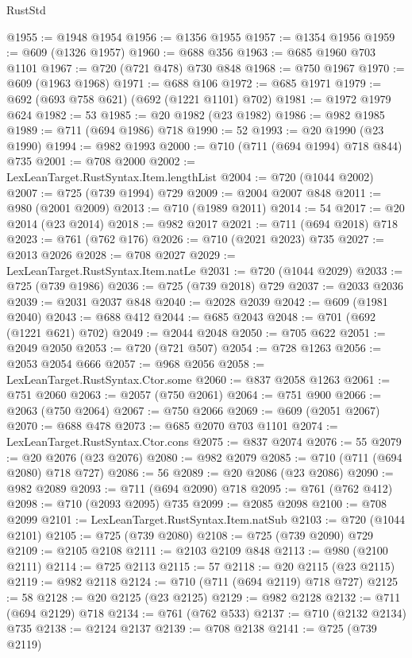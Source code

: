 \begin{lexlean}{RustStd}
\begin{coremodule}
@1955 := @1948 @1954
@1956 := @1356 @1955
@1957 := @1354 @1956
@1959 := @609 (@1326 @1957)
@1960 := @688 @356
@1963 := @685 @1960 @703 @1101
@1967 := @720 (@721 @478) @730 @848
@1968 := @750 @1967
@1970 := @609 (@1963 @1968)
@1971 := @688 @106
@1972 := @685 @1971
@1979 := @692 (@693 @758 @621) (@692 (@1221 @1101) @702)
@1981 := @1972 @1979 @624
@1982 := 53
@1985 := @20 @1982 (@23 @1982)
@1986 := @982 @1985
@1989 := @711 (@694 @1986) @718
@1990 := 52
@1993 := @20 @1990 (@23 @1990)
@1994 := @982 @1993
@2000 := @710 (@711 (@694 @1994) @718 @844) @735
@2001 := @708 @2000
@2002 := LexLeanTarget.RustSyntax.Item.lengthList
@2004 := @720 (@1044 @2002)
@2007 := @725 (@739 @1994) @729
@2009 := @2004 @2007 @848
@2011 := @980 (@2001 @2009)
@2013 := @710 (@1989 @2011)
@2014 := 54
@2017 := @20 @2014 (@23 @2014)
@2018 := @982 @2017
@2021 := @711 (@694 @2018) @718
@2023 := @761 (@762 @176)
@2026 := @710 (@2021 @2023) @735
@2027 := @2013 @2026
@2028 := @708 @2027
@2029 := LexLeanTarget.RustSyntax.Item.natLe
@2031 := @720 (@1044 @2029)
@2033 := @725 (@739 @1986)
@2036 := @725 (@739 @2018) @729
@2037 := @2033 @2036
@2039 := @2031 @2037 @848
@2040 := @2028 @2039
@2042 := @609 (@1981 @2040)
@2043 := @688 @412
@2044 := @685 @2043
@2048 := @701 (@692 (@1221 @621) @702)
@2049 := @2044 @2048
@2050 := @705 @622
@2051 := @2049 @2050
@2053 := @720 (@721 @507)
@2054 := @728 @1263
@2056 := @2053 @2054 @666
@2057 := @968 @2056
@2058 := LexLeanTarget.RustSyntax.Ctor.some
@2060 := @837 @2058 @1263
@2061 := @751 @2060
@2063 := @2057 (@750 @2061)
@2064 := @751 @900
@2066 := @2063 (@750 @2064)
@2067 := @750 @2066
@2069 := @609 (@2051 @2067)
@2070 := @688 @478
@2073 := @685 @2070 @703 @1101
@2074 := LexLeanTarget.RustSyntax.Ctor.cons
@2075 := @837 @2074
@2076 := 55
@2079 := @20 @2076 (@23 @2076)
@2080 := @982 @2079
@2085 := @710 (@711 (@694 @2080) @718 @727)
@2086 := 56
@2089 := @20 @2086 (@23 @2086)
@2090 := @982 @2089
@2093 := @711 (@694 @2090) @718
@2095 := @761 (@762 @412)
@2098 := @710 (@2093 @2095) @735
@2099 := @2085 @2098
@2100 := @708 @2099
@2101 := LexLeanTarget.RustSyntax.Item.natSub
@2103 := @720 (@1044 @2101)
@2105 := @725 (@739 @2080)
@2108 := @725 (@739 @2090) @729
@2109 := @2105 @2108
@2111 := @2103 @2109 @848
@2113 := @980 (@2100 @2111)
@2114 := @725 @2113
@2115 := 57
@2118 := @20 @2115 (@23 @2115)
@2119 := @982 @2118
@2124 := @710 (@711 (@694 @2119) @718 @727)
@2125 := 58
@2128 := @20 @2125 (@23 @2125)
@2129 := @982 @2128
@2132 := @711 (@694 @2129) @718
@2134 := @761 (@762 @533)
@2137 := @710 (@2132 @2134) @735
@2138 := @2124 @2137
@2139 := @708 @2138
@2141 := @725 (@739 @2119)

\end{coremodule}
\end{lexlean}
